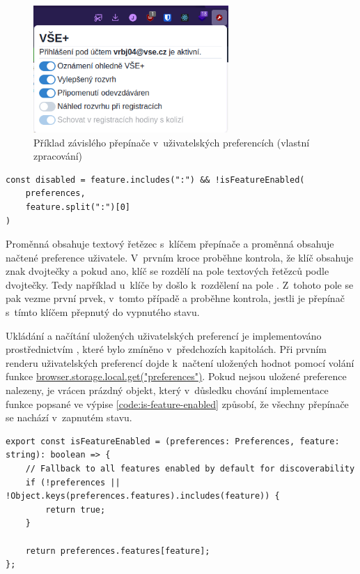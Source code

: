 \begin{figure}[H]\centering
    \includegraphics[width=0.66\textwidth]{img/zavisle-prepinace.png}
    \caption{Příklad závislého přepínače v~uživatelských preferencích (vlastní zpracování)}
    \label{fig:zavisle-prepinace}
\end{figure}

\begin{lstlisting}[label={code:user-preferences-disabled}, caption={Detekce stavu závislého přepínače (vlastní zpracování)}]
const disabled = feature.includes(":") && !isFeatureEnabled(
    preferences,
    feature.split(":")[0]
)
\end{lstlisting}

Proměnná  obsahuje textový řetězec s~klíčem přepínače a proměnná  obsahuje načtené preference uživatele. V~prvním kroce proběhne kontrola, že klíč obsahuje znak dvojtečky a pokud ano, klíč se rozdělí na pole textových řetězců podle dvojtečky. Tedy například u~klíče  by došlo k~rozdělení na pole . Z~tohoto pole se pak vezme první prvek, v~tomto případě  a proběhne kontrola, jestli je přepínač s~tímto klíčem přepnutý do vypnutého stavu.


Ukládání a načítání uložených uživatelských preferencí je implementováno prostřednictvím , které bylo zmíněno v~předchozích kapitolách. Při prvním renderu uživatelských preferencí dojde k~načtení uložených hodnot pomocí volání funkce \url{browser.storage.local.get("preferences")}. Pokud nejsou uložené preference nalezeny, je vrácen prázdný objekt, který v~důsledku chování implementace funkce  popsané ve výpise \ref{code:is-feature-enabled} způsobí, že všechny přepínače se nachází v~zapnutém stavu. 

\begin{lstlisting}[label={code:is-feature-enabled}, caption={Definice funkce \code{isFeatureEnabled} (vlastní zpracování).}]
export const isFeatureEnabled = (preferences: Preferences, feature: string): boolean => {
    // Fallback to all features enabled by default for discoverability
    if (!preferences || !Object.keys(preferences.features).includes(feature)) {
        return true;
    }

    return preferences.features[feature];
};
\end{lstlisting}


